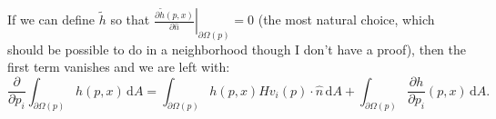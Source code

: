 \documentclass[10pt]{article}
\providecommand{\shape}{\Omega(p)}
\providecommand{\boundary}{\partial \shape}
\providecommand{\sint}[1]{\int_{\boundary} \! #1 \, \mathrm{d}A}
\providecommand{\pder}[2]{\frac{\partial #1}{\partial #2}}
\providecommand{\evalat}[2]{\left.#1\right|_{#2}}
\begin{document}
\begin{appendices}
    If we can define $\tilde{h}$ so that $\evalat{\pder{\tilde{h}(p, x)}{\hat{n}}}{\boundary} = 0$
    (the most natural choice, which should be possible to do in a
    neighborhood though I don't have a proof), then the first term
    vanishes and we are left with:
    \begin{equation}
     \pder{}{p_i} \sint{h(p, x)} =
     \sint{h(p, x) H v_i(p) \cdot \hat{n}}
        + \sint{\pder{h}{p_i}(p, x)}.
        \label{eqn:surface_derivative_simple}
    \end{equation}
\end{appendices}


\end{document}
